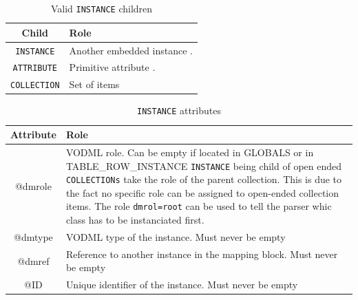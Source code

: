 \documentclass[11pt,a4paper]{ivoa}
\begin{document}
\begin{table}[!htbp]
\small
\centering
\begin{tabulary}{\linewidth}{|c|J|}       
       \hline 
           \textbf{Child} &  
           \textbf{Role} \\
       \hline         \hline  
           \texttt{INSTANCE}    & 
           Another embedded instance . \\       
       \hline  
           \texttt{ATTRIBUTE}    & 
           Primitive attribute . \\       
       \hline  
            \texttt{COLLECTION}    & 
           Set of items\\      
       \hline 
     \end{tabulary}
     \caption{Valid  \texttt{INSTANCE} children} 
     \label{tbl:inst-chilrdren}
\end{table}

\begin{table}[!htbp]
\small
\centering
\begin{tabulary}{\linewidth}{|c|J|}       
       \hline 
            \textbf{Attribute} &  
            \textbf{Role}\\
       \hline  \hline
            @dmrole    & 
            VODML role.  \newline Can be empty if located in GLOBALS or in TABLE\_ROW\_INSTANCE 
                                   \newline  \texttt{INSTANCE} being child of open ended \texttt{COLLECTIONs} 
                                   take the role of the parent collection. This is due to the fact no specific role can be assigned to open-ended collection items. 
                                   \newline  The role  \texttt{dmrol=root} can be used to tell the parser whic class has to be instanciated first.

                                   \\
       \hline  
            @dmtype & 
            VODML type of the instance.  \newline Must never be empty \\
       \hline  
            @dmref  & 
            Reference to another instance in the mapping block. 
            \newline  Must never be empty\\          
       \hline  
            @ID  & 
            Unique identifier of the instance. 
            \newline  Must never be empty\\
       \hline 
     \end{tabulary}
     \caption{\texttt{INSTANCE} attributes} 
     \label{tbl:inst-att}
 \end{table}
\end{document}

